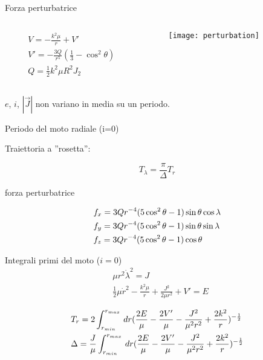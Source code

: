\begin{frame}{Forza perturbatrice}

\begin{columns}
\begin{column}{0.6\textwidth}

\begin{align*}
&V=-\frac{k^2\mu}{r}+V'\\
&V'=-\frac{3Q}{r^5}(\frac{1}{3}-\cos^2{\theta})\\
&Q=\frac{1}{2}k^2\mu R^2J_2
\end{align*}

\end{column}
\begin{column}{0.4\textwidth}

\begin{figure}[!ht]
\texttt{[image: perturbation]}
\end{figure}

\end{column}
\end{columns}

$e$, $i$, $|\vec{J}|$ non variano in media su un periodo.

\begin{block}{Periodo del moto radiale (i=0)}

Traiettoria a ''rosetta'':

\begin{equation*}
T_{\lambda}=\frac{\pi}{\Delta}T_{r}
\end{equation*}

\end{block}

\end{frame}

\begin{wordonframe}{forza perturbatrice}

\begin{align*}
&f_x=3Qr^{-4}(5\cos^2{\theta}-1)\sin{\theta}\cos{\lambda}\\
&f_y=3Qr^{-4}(5\cos^2{\theta}-1)\sin{\theta}\sin{\lambda}\\
&f_z=3Qr^{-4}(5\cos^2{\theta}-1)\cos{\theta}
\end{align*}

\begin{block}{Integrali primi del moto ($i=0$)}
\begin{align*}
&\mu r^2\dot{\lambda}^2=J\\
&\frac{1}{2}\mu\dot{r}^2-\frac{k^2\mu}{r}+\frac{J^2}{2\mu r^2}+V'=E
\end{align*}
\end{block}

\begin{align*}
&T_r=2\int_{r_{min}}^{r_{max}}\,dr(\frac{2E}{\mu}-\frac{2V'}{\mu}-\frac{J^2}{\mu^2r^2}+\frac{2k^2}{r})^{-\frac{1}{2}}\\
&\Delta=\frac{J}{\mu}\int_{r_{min}}^{r_{max}}\,dr(\frac{2E}{\mu}-\frac{2V'}{\mu}-\frac{J^2}{\mu^2r^2}+\frac{2k^2}{r})^{-\frac{1}{2}}
\end{align*}

\end{wordonframe}

